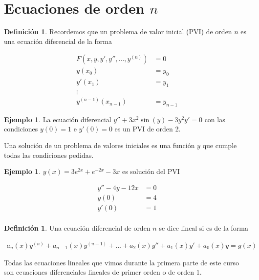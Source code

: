 \documentclass{article}
\theoremstyle{plain}
\theoremstyle{definition}
\newtheorem{defin}[thm]{Definición}
\newtheorem{ejem}[thm]{Ejemplo}
\begin{document}
\section{Ecuaciones de orden $n$}



\begin{defin}Recordemos que un problema de valor inicial (PVI) de orden $n$ es una ecuación diferencial de la forma
\end{defin}


\begin{align*}
F(x,y,y',y'', ... ,y^{(n)}) &=0 \\
y(x_0)&=y_0 \\
y'(x_1)&=y_1 \\
\vdots \\
y^{(n-1)}(x_{n-1}) &=y_{n-1}
\end{align*}


\begin{ejem}La ecuación diferencial $y''+3x^2\sin(y)-3y^2y' =0$ con las condiciones $y(0)=1$ e $y'(0)=0$ es un PVI de orden 2. \\
\end{ejem}


Una solución de un problema de valores iniciales es una función $y$ que cumple todas las condiciones pedidas. \\

\begin{ejem}$y(x)= 3e^{2x} +e^{-2x}-3x$  es solución del PVI
\end{ejem}


\begin{align*}
y''-4y-12x &=0\\
y(0) &= 4 \\
y'(0) &=1 \\
\end{align*}


\begin{defin}Una ecuación diferencial de orden $n$ se dice lineal si es de la forma
\end{defin}


\begin{align*}
a_n(x)y^{(n)} + a_{n-1}(x)y^{(n-1)}+ ... + a_2(x)y''+a_1(x)y' +a_0(x)y =g(x)
\end{align*}

Todas las ecuaciones lineales que vimos durante la primera parte de este curso son ecuaciones diferenciales lineales de primer orden o de orden 1. \\
\end{document}
